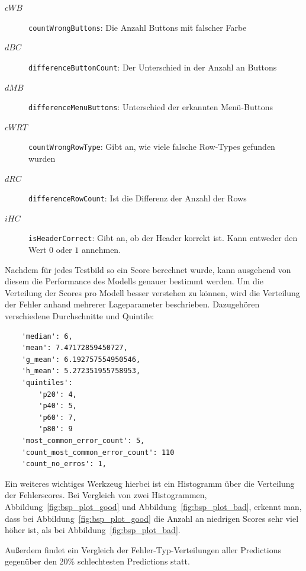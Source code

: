 \documentclass[pdftex,a4paper,halfparskip, article]{scrartcl}
\begin{document}
\begin{description}
	\item[$cWB$] \texttt{countWrongButtons}: Die Anzahl Buttons mit falscher Farbe
	\item[$dBC$] \texttt{differenceButtonCount}: Der Unterschied in der Anzahl an Buttons
	\item[$dMB$] \texttt{differenceMenuButtons}: Unterschied der erkannten Menü-Buttons
	\item[$cWRT$] \texttt{countWrongRowType}: Gibt an, wie viele falsche Row-Types gefunden wurden
	\item[$dRC$] \texttt{differenceRowCount}: Ist die Differenz der Anzahl der Rows
	\item[$iHC$] \texttt{isHeaderCorrect}: Gibt an, ob der Header korrekt ist. Kann entweder den Wert $0$ oder $1$ annehmen.	
\end{description}

Nachdem für jedes Testbild so ein Score berechnet wurde, kann ausgehend von diesem die Performance des Modells genauer bestimmt werden. Um die Verteilung der Scores pro Modell besser verstehen zu können, wird die Verteilung der Fehler anhand mehrerer Lageparameter beschrieben. Dazugehören verschiedene Durchschnitte und Quintile:
  \begin{verbatim}
    'median': 6, 
    'mean': 7.47172859450727, 
    'g_mean': 6.192757554950546, 
    'h_mean': 5.272351955758953, 
    'quintiles':
        'p20': 4,
        'p40': 5, 
        'p60': 7, 
        'p80': 9 
    'most_common_error_count': 5, 
    'count_most_common_error_count': 110
    'count_no_erros': 1, 
 \end{verbatim}
Ein weiteres wichtiges Werkzeug hierbei ist ein Histogramm über die Verteilung der Fehlerscores. Bei Vergleich von zwei Histogrammen, Abbildung~\ref{fig:bsp_plot_good} und Abbildung~\ref{fig:bsp_plot_bad}, erkennt man, dass bei Abbildung~\ref{fig:bsp_plot_good} die Anzahl an niedrigen Scores sehr viel höher ist, als bei Abbildung~\ref{fig:bsp_plot_bad}.

Außerdem findet ein Vergleich der Fehler-Typ-Verteilungen aller Predictions gegenüber den 20\% schlechtesten Predictions statt.

\end{document}
